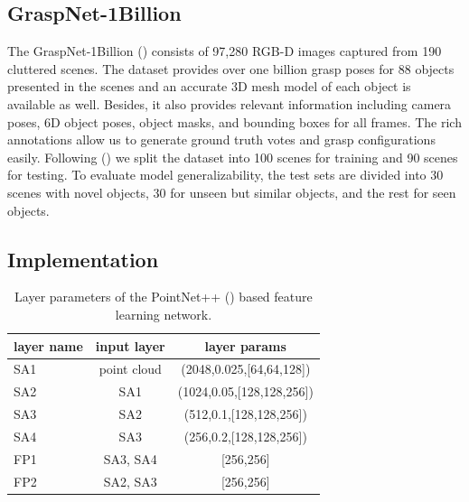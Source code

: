 
\subsection{GraspNet-1Billion}

The GraspNet-1Billion (\textcolor{cyan}{\cite{fang2020graspnet}}) consists of 97,280 RGB-D images captured from 190 cluttered scenes. The dataset provides over one billion grasp poses for 88 objects presented in the scenes and an accurate 3D mesh model of each object is available as well. Besides, it also provides relevant information including camera poses, 6D object poses, object masks, and bounding boxes for all frames. The rich annotations allow us to generate ground truth votes and grasp configurations easily. Following (\textcolor{cyan}{\cite{fang2020graspnet}}) we split the dataset into 100 scenes for training and 90 scenes for testing. To evaluate model generalizability, the test sets are divided into 30 scenes with novel objects, 30 for unseen but similar objects, and the rest for seen objects.

\subsection{Implementation}


\begin{table}[h]
\caption{Layer parameters of the PointNet++ (\textcolor{cyan}{\cite{qi2017pointnet++}}) based feature learning network.}
\label{tab:layer_specs}
\begin{center}
\begin{tabular}{|l|c|c|}
\hline
layer name & input layer & layer params \\
\hline
SA1 & point cloud & (2048,0.025,[64,64,128]) \\
SA2 & SA1  & (1024,0.05,[128,128,256]) \\
SA3 & SA2 & (512,0.1,[128,128,256]) \\
SA4 & SA3 & (256,0.2,[128,128,256]) \\
FP1 & SA3, SA4 & [256,256] \\ 
FP2 & SA2, SA3 & [256,256] \\
\hline
\end{tabular}
\end{center}
\end{table}

